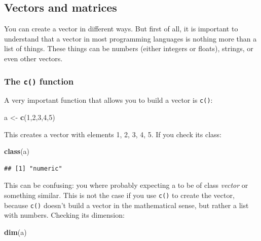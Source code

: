 \documentclass[]{gitbook}
\newenvironment{Shaded}{\begin{snugshade}}{\end{snugshade}}
\newcommand{\DecValTok}[1]{\textcolor[rgb]{0.00,0.00,0.81}{#1}}
\newcommand{\KeywordTok}[1]{\textcolor[rgb]{0.13,0.29,0.53}{\textbf{#1}}}
\newcommand{\NormalTok}[1]{#1}
\newcommand{\StringTok}[1]{\textcolor[rgb]{0.31,0.60,0.02}{#1}}
\theoremstyle{definition}
\theoremstyle{definition}
\theoremstyle{definition}
\theoremstyle{remark}
\begin{document}
\hypertarget{vectors-and-matrices}{%
\subsection{Vectors and matrices}\label{vectors-and-matrices}}

You can create a vector in different ways. But first of all, it is
important to understand that a vector in most programming languages is
nothing more than a list of things. These things can be numbers (either
integers or floats), strings, or even other vectors.

\hypertarget{the-c-function}{%
\subsubsection{\texorpdfstring{The \texttt{c()}
function}{The c() function}}\label{the-c-function}}

A very important function that allows you to build a vector is
\texttt{c()}:

\begin{Shaded}
\begin{Highlighting}[]
\NormalTok{a <-}\StringTok{ }\KeywordTok{c}\NormalTok{(}\DecValTok{1}\NormalTok{,}\DecValTok{2}\NormalTok{,}\DecValTok{3}\NormalTok{,}\DecValTok{4}\NormalTok{,}\DecValTok{5}\NormalTok{)}
\end{Highlighting}
\end{Shaded}

This creates a vector with elements 1, 2, 3, 4, 5. If you check its
class:

\begin{Shaded}
\begin{Highlighting}[]
\KeywordTok{class}\NormalTok{(a)}
\end{Highlighting}
\end{Shaded}

\begin{verbatim}
## [1] "numeric"
\end{verbatim}

This can be confusing: you where probably expecting a to be of class
\emph{vector} or something similar. This is not the case if you use
\texttt{c()} to create the vector, because \texttt{c()} doesn't build a
vector in the mathematical sense, but rather a list with numbers.
Checking its dimension:

\begin{Shaded}
\begin{Highlighting}[]
\KeywordTok{dim}\NormalTok{(a)}
\end{Highlighting}
\end{Shaded}
\end{document}
